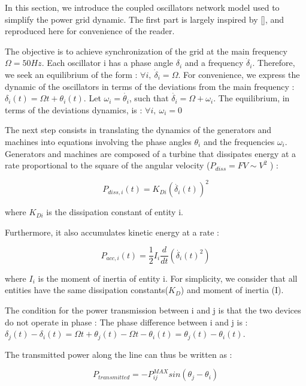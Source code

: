 \documentclass[10pt,twoside%
                ,draft%
        ]{article}
\begin{document}
In this section, we introduce the coupled oscillators network model used to simplify the power grid dynamic. The first part is largely inspired by [], and reproduced here for convenience of the reader.

 The objective is to achieve synchronization of the grid at the main frequency $ \Omega = 50 Hz $. Each oscillator i has a phase angle $ \delta_i $ and a frequency $ \dot{\delta}_i $. Therefore, we seek an equilibrium of the form : $ \forall i,\ \dot{\delta}_i = \Omega $. For convenience, we express the dynamic of the oscillators in terms of the deviations from the main frequency : $ \delta_i(t) = \Omega t + \theta_i(t) $. Let $ \omega_i = \dot{\theta_i} $, such that $ \dot{\delta_i} = \Omega + \omega_i $. The equilibrium, in terms of the deviations dynamics, is : $ \forall i,\ \omega_i = 0 $

The next step consists in translating the dynamics of the generators and machines into equations involving the phase angles $ \theta_i $ and the frequencies $ \omega_i$. Generators and machines are composed of a turbine that dissipates energy at a rate proportional to the square of the angular velocity ($P_{diss} = FV \sim V^2 $ ) : 

\begin{equation}
  P_{diss, i}(t) = K_{Di}(\dot{\delta_i}(t))^2 
\end{equation}

where $ K_{Di} $ is the dissipation constant of entity i.

Furthermore, it also accumulates kinetic energy at a rate : 

\begin{equation} 
P_{acc,i}(t) = \frac{1}{2}I_i\frac{d}{dt} \left( \dot{ \delta_i }(t)^2 \right)
\end{equation} 

where $ I_{i}$ is the moment of inertia of entity i. For simplicity, we consider that all entities have the same dissipation constants($K_D$) and moment of inertia (I).

The condition for the power transmission between i and j is that the two devices do not operate in phase : The phase difference between i and j is : $ \delta_j(t) - \delta_i(t) = \Omega t + \theta_j(t) - \Omega t - \theta_i(t) = \theta_j(t) - \theta_i(t) $.

The transmitted power along the line can thus be written as : 

\begin{equation}
 P_{transmitted} = - P_{ij}^{MAX} sin( \theta_j - \theta_i )
\end{equation}
  
\end{document}
